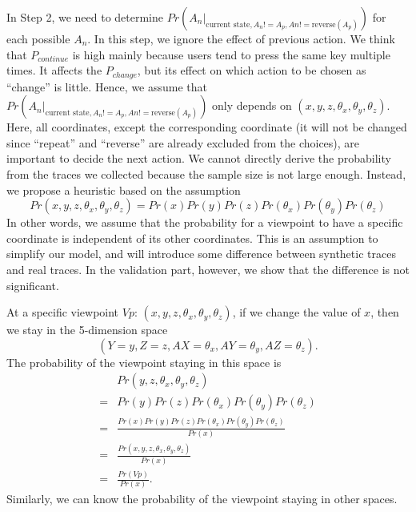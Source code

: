 In Step 2, we need to determine $Pr(A_n |_{\textrm{current state}, A_n != A_p, An != \textrm{reverse}(A_p)})$
for each possible $A_n$. In this step, we ignore the effect of previous action. 
We think that $P_{continue}$ is high mainly because users tend to press the same key multiple times. 
It affects the $P_{change}$, but its effect on which action to be chosen as ``change'' is little.
Hence, we assume that $Pr(A_n |_{\textrm{current state}, A_n != A_p, An != \textrm{reverse}(A_p)})$
only depends on $(x, y, z, \theta_x, \theta_y, \theta_z)$. Here, all coordinates, except the corresponding coordinate
(it will not be changed since ``repeat'' and ``reverse'' are already excluded from the choices),
are important to decide the next action. 
We cannot directly derive the probability from the traces we collected because the sample size is not large enough.
Instead, we propose a heuristic based on the assumption
\[
    Pr(x, y, z, \theta_x, \theta_y, \theta_z) = Pr(x)Pr(y)Pr(z)Pr(\theta_x)Pr(\theta_y)Pr(\theta_z)
\]
In other words, we assume that the probability for a viewpoint to have a specific coordinate is independent of its 
other coordinates. This is an assumption to simplify our model, and will introduce some difference between
synthetic traces and real traces. In the validation part, however, we show that the difference is not 
significant.

At a specific viewpoint $Vp$: $(x, y, z, \theta_x, \theta_y, \theta_z)$, if we change the value of $x$, 
then we stay in the 5-dimension space
\[
    (Y=y, Z=z, AX=\theta_x, AY=\theta_y, AZ=\theta_z).
\]
The probability of the viewpoint staying in this space is 
\begin{align*}
    &Pr(y, z, \theta_x, \theta_y, \theta_z)\\
    =&Pr(y)Pr(z)Pr(\theta_x)Pr(\theta_y)Pr(\theta_z)\\
    =&\frac{Pr(x)Pr(y)Pr(z)Pr(\theta_x)Pr(\theta_y)Pr(\theta_z)}{Pr(x)}\\
    =&\frac{Pr(x, y, z, \theta_x, \theta_y, \theta_z)}{Pr(x)}\\
    =&\frac{Pr(Vp)}{Pr(x)}.
\end{align*}
Similarly, we can know the probability of the viewpoint staying in other spaces. 


